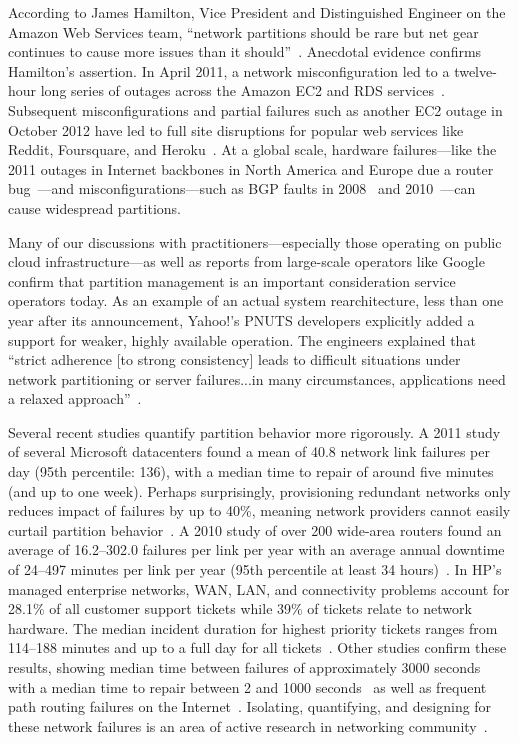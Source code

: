 According to James Hamilton, Vice President and Distinguished Engineer
on the Amazon Web Services team, ``network partitions should be rare
but net gear continues to cause more issues than it
should''~\cite{hamilton-partitions}. Anecdotal evidence confirms
Hamilton's assertion. In April 2011, a network misconfiguration led to
a twelve-hour long series of outages across the Amazon EC2 and RDS
services~\cite{amazon-netpartition}. Subsequent misconfigurations and
partial failures such as another EC2 outage in October 2012 have led
to full site disruptions for popular web services like Reddit,
Foursquare, and Heroku~\cite{ec2-downsites}. At a global scale,
hardware failures---like the 2011 outages in Internet backbones in
North America and Europe due a router
bug~\cite{juniper-partition}---and misconfigurations---such as BGP
faults in 2008~\cite{pakistan-youtube} and
2010~\cite{research-experiment-partition}---can cause widespread
partitions.

Many of our discussions with practitioners---especially those
operating on public cloud infrastructure---as well as reports from
large-scale operators like Google~\cite{dean-keynote} confirm that
partition management is an important consideration service operators
today. As an example of an actual system rearchitecture, less than one
year after its announcement, Yahoo!'s PNUTS developers explicitly
added a support for weaker, highly available operation. The engineers
explained that ``strict adherence [to strong consistency] leads to
difficult situations under network partitioning or server
failures...in many circumstances, applications need a relaxed
approach''~\cite{pnuts-update}.

Several recent studies quantify partition behavior more rigorously. A
2011 study of several Microsoft datacenters found a mean of 40.8
network link failures per day (95th percentile: 136), with a median
time to repair of around five minutes (and up to one week). Perhaps
surprisingly, provisioning redundant networks only reduces impact of
failures by up to 40\%, meaning network providers cannot easily
curtail partition behavior~\cite{sigcomm-dc}. A 2010 study of over 200
wide-area routers found an average of 16.2--302.0 failures per link
per year with an average annual downtime of 24--497 minutes per link
per year (95th percentile at least 34 hours)~\cite{sigcomm-wan}. In
HP's managed enterprise networks, WAN, LAN, and connectivity problems
account for 28.1\% of all customer support tickets while 39\% of
tickets relate to network hardware.  The median incident duration for
highest priority tickets ranges from 114--188 minutes and up to a full
day for all tickets~\cite{turner2012failure}. Other studies confirm
these results, showing median time between failures of approximately
3000 seconds with a median time to repair between 2 and 1000
seconds~\cite{ip-backbone-failures} as well as frequent path routing
failures on the Internet~\cite{labovitz-failures}. Isolating,
quantifying, and designing for these network failures is an area of
active research in networking
community~\cite{surviving-failures-bodik, uw-failure-networks}.

